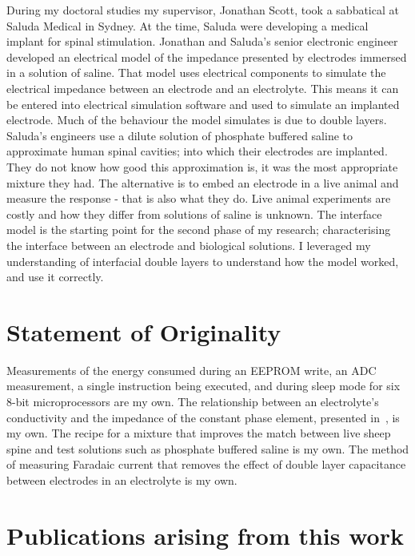   During my doctoral studies my supervisor, Jonathan Scott, took a sabbatical at Saluda Medical in Sydney.
  At the time, Saluda were developing a medical implant for spinal stimulation.
  Jonathan and Saluda's senior electronic engineer developed an electrical model of the impedance presented by electrodes immersed in a solution of saline.
  That model uses electrical components to simulate the electrical impedance between an electrode and an electrolyte.
  This means it can be entered into electrical simulation software and used to simulate an implanted electrode.
  Much of the behaviour the model simulates is due to double layers.
  Saluda's engineers use a dilute solution of phosphate buffered saline to approximate human spinal cavities; into which their electrodes are implanted.
  They do not know how good this approximation is, it was the most appropriate mixture they had.
  The alternative is to embed an electrode in a live animal and measure the response - that is also what they do.
  Live animal experiments are costly and how they differ from solutions of saline is unknown.
  The interface model is the starting point for the second phase of my research; characterising the interface between an electrode and biological solutions.
  I leveraged my understanding of interfacial double layers to understand how the model worked, and use it correctly.


\section{Statement of Originality}


  Measurements of the energy consumed during an EEPROM write, an ADC measurement, a single instruction being executed, and during sleep mode for six 8-bit microprocessors are my own.
  The relationship between an electrolyte's conductivity and the impedance of the constant phase element, presented in~, is my own.
  The recipe for a mixture that improves the match between live sheep spine and test solutions such as phosphate buffered saline is my own.
  The method of measuring Faradaic current that removes the effect of double layer capacitance between electrodes in an electrolyte is my own.


\section{Publications arising from this work}


